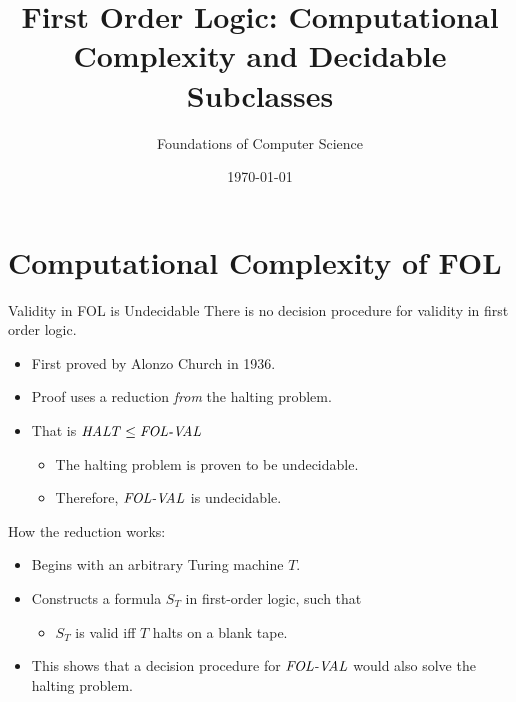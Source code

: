 \documentclass[style=sailor,size=12pt,mode=present]{powerdot}
\title{First Order Logic: Computational Complexity and Decidable Subclasses}
\author{Foundations of Computer Science}
\date{\today}
\newcommand{\id}[1]{\mbox{\it #1\/}}
\theoremstyle{definition}
\begin{document}
\maketitle
\section[slide=false]{Computational Complexity of FOL}
\begin{slide}[bm=,toc=]{Validity in FOL is Undecidable}
There is no decision procedure for validity in first order logic.
\begin{itemize}
\item First proved by Alonzo Church in 1936.
\item Proof uses a reduction \emph{from} the halting problem.
\item That is $\id{HALT} \leq \id{FOL-VAL}$
\begin{itemize}
\item The halting problem is proven to be undecidable.
\item Therefore, $\id{FOL-VAL}$ is undecidable.
\end{itemize}
\end{itemize}
How the reduction works:
\begin{itemize}
\item Begins with an arbitrary Turing machine $T$.
\item Constructs a formula $S_T$ in first-order logic, such that
\begin{itemize}
\item $S_T$ is valid iff $T$ halts on a blank tape.
\end{itemize}
\item This shows that a decision procedure for $\id{FOL-VAL}$ would also solve
the halting problem.
\end{itemize}
\end{slide}
\end{document}
